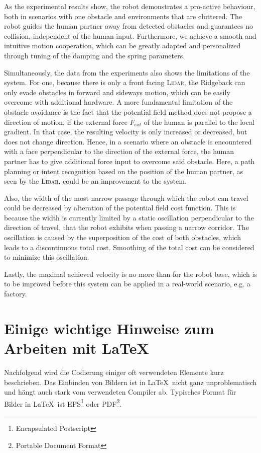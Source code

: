 As the experimental results show, the robot demonstrates a pro-active behaviour, both in scenarios with one obstacle and environments that are cluttered. The robot guides the human partner away from detected obstacles and guarantees no collision, independent of the human input. Furthermore, we achieve a smooth and intuitive motion cooperation, which can be greatly adapted and personalized through tuning of the damping and the spring parameters.

Simultaneously, the data from the experiments also shows the limitations of the system. For one, because there is only a front facing \textsc{Lidar}, the Ridgeback can only evade obstacles in forward and sideways motion, which can be easily overcome with additional hardware. A more fundamental limitation of the obstacle avoidance is the fact that the potential field method does not propose a direction of motion, if the external force $F_{ext}$ of the human is parallel to the local gradient. In that case, the resulting velocity is only increased or decreased, but does not change direction. Hence, in a scenario where an obstacle is encountered with a face perpendicular to the direction of the external force, the human partner has to give additional force input to overcome said obstacle. Here, a path planning or intent recognition based on the position of the human partner, as seen by the \textsc{Lidar}, could be an improvement to the system.

Also, the width of the most narrow passage through which the robot can travel could be decreased by alteration of the potential field cost function. This is because the width is currently limited by a static oscillation perpendicular to the direction of travel, that the robot exhibits when passing a narrow corridor. The oscillation is caused by the superposition of the cost of both obstacles, which leads to a discontinuous total cost. Smoothing of the total cost can be considered to minimize this oscillation.

Lastly, the maximal achieved velocity is no more than  for the robot base, which is to be improved before this system can be applied in a real-world scenario, e.g. a factory.

\chapter{Einige wichtige Hinweise zum Arbeiten mit \LaTeX\ }
\label{sec:latexumg}

Nachfolgend wird die Codierung einiger oft verwendeten Elemente
kurz beschrieben. Das Einbinden von Bildern ist in \LaTeX\ nicht
ganz unproblematisch und hängt auch stark vom verwendeten Compiler
ab. Typisches Format für Bilder in \LaTeX\ ist
EPS\footnote{Encapsulated Postscript} oder PDF\footnote{Portable Document Format}.


